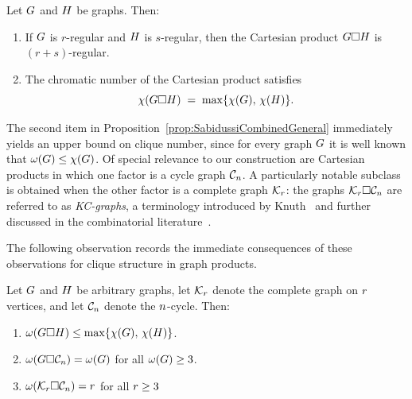 \begin{proposition}
\label{prop:SabidussiCombinedGeneral}
Let $G$ and $H$ be graphs. Then:
\begin{enumerate}
    \item If $G$ is $r$-regular and $H$ is $s$-regular, then the Cartesian product $G \square H$ is $(r+s)$-regular. \label{GraphProdReg}
    \item The chromatic number of the Cartesian product satisfies
    \[
    \chi(G \square H) \;=\; \max\{\chi(G),\, \chi(H)\}. \label{GraphProdChrom}
    \]
\end{enumerate}
\end{proposition}

The second item in Proposition~\ref{prop:SabidussiCombinedGeneral} immediately yields an upper bound on clique number, since for every graph $G$ it is well known that $\omega(G) \leq \chi(G)$. Of special relevance to our construction are Cartesian products in which one factor is a cycle graph $\mathcal{C}_n$. A particularly notable subclass is obtained when the other factor is a complete graph $\mathcal{K}_r$: the graphs $\mathcal{K}_r \square \mathcal{C}_n$ are referred to as \emph{KC-graphs}, a terminology introduced by Knuth~\cite{Knuth:TAOCP4F7} and further discussed in the combinatorial literature~\cite{Knuth:CoupsGracefulGraphs,MathWorld:KCGraph}.

The following observation records the immediate consequences of these observations for clique structure in graph products.

\begin{observation}\label{obs:ProdCliqInvs}
    Let $G$ and $H$ be arbitrary graphs, let $\mathcal{K}_r$ denote the complete graph on $r$ vertices, and let $\mathcal{C}_n$ denote the $n$-cycle. Then:
    \begin{enumerate}
        \item $\omega(G \square H) \leq \max\{\chi(G),\, \chi(H)\}$. \label{ProdCliqInvsGH}
        \item $\omega(G \square \mathcal{C}_n) = \omega(G)$ for all $\omega(G) \geq 3$. \label{ProdCliqInvsGC}
        \item $\omega(\mathcal{K}_r \square \mathcal{C}_n) = r$ for all $r \geq 3$ \label{ProdCliqInvsKC}
    \end{enumerate}
\end{observation}


